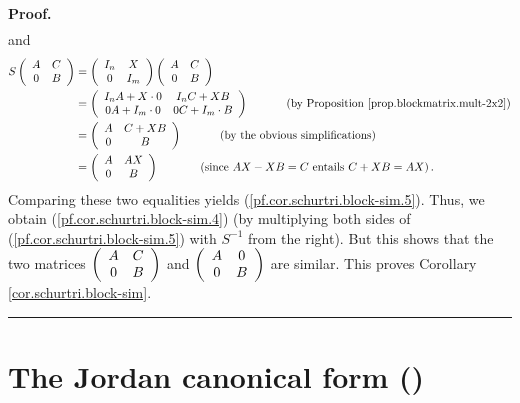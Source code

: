 \documentclass[numbers=enddot,12pt,final,onecolumn,notitlepage]{scrartcl}%
\numberwithin{exer}{subsection}
\theoremstyle{definition}
\newenvironment{proof}[1][Proof]{\noindent\textbf{#1.} }{\ \rule{0.5em}{0.5em}}
\begin{document}
\begin{proof}
\begin{align*}
\end{align*}
and%
\begin{align*}
S\left(
\begin{array}
[c]{cc}%
A & C\\
0 & B
\end{array}
\right)   &  =\left(
\begin{array}
[c]{cc}%
I_{n} & X\\
0 & I_{m}%
\end{array}
\right)  \left(
\begin{array}
[c]{cc}%
A & C\\
0 & B
\end{array}
\right) \\
&  =\left(
\begin{array}
[c]{cc}%
I_{n}A+X\cdot0 & I_{n}C+XB\\
0A+I_{m}\cdot0 & 0C+I_{m}\cdot B
\end{array}
\right)  \ \ \ \ \ \ \ \ \ \ \left(  \text{by Proposition
\ref{prop.blockmatrix.mult-2x2}}\right) \\
&  =\left(
\begin{array}
[c]{cc}%
A & C+XB\\
0 & B
\end{array}
\right)  \ \ \ \ \ \ \ \ \ \ \left(  \text{by the obvious simplifications}%
\right) \\
&  =\left(
\begin{array}
[c]{cc}%
A & AX\\
0 & B
\end{array}
\right)  \ \ \ \ \ \ \ \ \ \ \ \left(  \text{since }AX-XB=C\text{ entails
}C+XB=AX\right)  .
\end{align*}
Comparing these two equalities yields (\ref{pf.cor.schurtri.block-sim.5}).
Thus, we obtain (\ref{pf.cor.schurtri.block-sim.4}) (by multiplying both sides
of (\ref{pf.cor.schurtri.block-sim.5}) with $S^{-1}$ from the right). But this
shows that the two matrices $\left(
\begin{array}
[c]{cc}%
A & C\\
0 & B
\end{array}
\right)  $ and $\left(
\begin{array}
[c]{cc}%
A & 0\\
0 & B
\end{array}
\right)  $ are similar. This proves Corollary \ref{cor.schurtri.block-sim}.
\end{proof}

\section{The Jordan canonical form (\cite[Chapter 3]{HorJoh13})}
\end{document}
